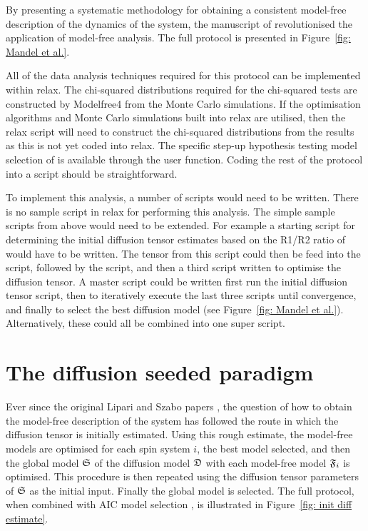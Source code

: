 By presenting a systematic methodology for obtaining a consistent model-free description of the dynamics of the system, the manuscript of \citet{Mandel95} revolutionised the application of model-free analysis.
The full protocol is presented in Figure~\ref{fig: Mandel et al.}.

All of the data analysis techniques required for this protocol can be implemented within relax.
The chi-squared distributions required for the chi-squared tests are constructed by Modelfree4 from the Monte Carlo simulations.
If the optimisation algorithms and Monte Carlo simulations built into relax are utilised, then the relax script will need to construct the chi-squared distributions from the results as this is not yet coded into relax.
The specific step-up hypothesis testing model selection of \citet{Mandel95} is available through the  user function.
Coding the rest of the protocol into a script should be straightforward.

To implement this analysis, a number of scripts would need to be written.
There is no sample script in relax for performing this analysis.
The simple sample scripts from above would need to be extended.
For example a starting script for determining the initial diffusion tensor estimates based on the R1/R2 ratio of \citet{Kay89} would have to be written.
The tensor from this script could then be feed into the  script, followed by the  script, and then a third script written to optimise the diffusion tensor.
A master script could be written first run the initial diffusion tensor script, then to iteratively execute the last three scripts until convergence, and finally to select the best diffusion model (see Figure~\ref{fig: Mandel et al.}).
Alternatively, these could all be combined into one super script.




\section{The diffusion seeded paradigm}
\label{sect: diffusion seeded paradigm}

Ever since the original Lipari and Szabo papers \citep{LipariSzabo82a, LipariSzabo82b}, the question of how to obtain the model-free description of the system has followed the route in which the diffusion tensor is initially estimated.
Using this rough estimate, the model-free models are optimised for each spin system $i$, the best model selected, and then the global model $\mathfrak{S}$ of the diffusion model $\mathfrak{D}$ with each model-free model $\mathfrak{F}_i$ is optimised.
This procedure is then repeated using the diffusion tensor parameters of $\mathfrak{S}$ as the initial input.
Finally the global model is selected.
The full protocol, when combined with AIC model selection \citep{dAuvergneGooley03}, is illustrated in Figure~\ref{fig: init diff estimate}.


